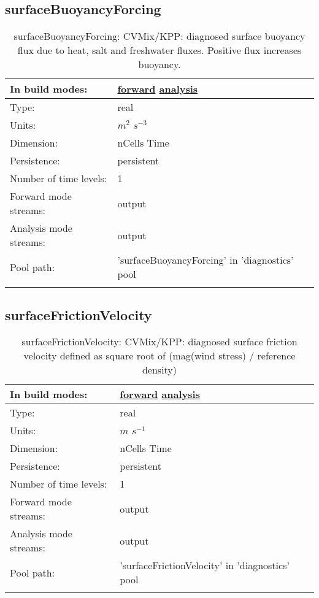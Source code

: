 \subsection[surfaceBuoyancyForcing]{surfaceBuoyancyForcing}
\label{subsec:var_sec_diagnostics_surfaceBuoyancyForcing}
\begin{center}
\begin{longtable}{| p{2.0in} | p{4.0in} |}
        \hline 
        In build modes: & \hyperref[subsec:forward_var_tab_diagnostics]{forward} \hyperref[subsec:analysis_var_tab_diagnostics]{analysis} \\
        \hline 
        Type: & real \\
        \hline 
        Units: & $m^2$ $s^{-3}$ \\
        \hline 
        Dimension: & nCells Time \\
        \hline 
        Persistence: & persistent \\
        \hline 
        Number of time levels: & 1 \\
        \hline 
		 Forward mode streams: &  output \\
        \hline 
		 Analysis mode streams: &  output \\
        \hline 
            Pool path: & 'surfaceBuoyancyForcing' in 'diagnostics' pool
 \\
		 \hline 
    \caption{surfaceBuoyancyForcing: CVMix/KPP: diagnosed surface buoyancy flux due to heat, salt and freshwater fluxes. Positive flux increases buoyancy.}
\end{longtable}
\end{center}
\subsection[surfaceFrictionVelocity]{surfaceFrictionVelocity}
\label{subsec:var_sec_diagnostics_surfaceFrictionVelocity}
\begin{center}
\begin{longtable}{| p{2.0in} | p{4.0in} |}
        \hline 
        In build modes: & \hyperref[subsec:forward_var_tab_diagnostics]{forward} \hyperref[subsec:analysis_var_tab_diagnostics]{analysis} \\
        \hline 
        Type: & real \\
        \hline 
        Units: & $m$ $s^{-1}$ \\
        \hline 
        Dimension: & nCells Time \\
        \hline 
        Persistence: & persistent \\
        \hline 
        Number of time levels: & 1 \\
        \hline 
		 Forward mode streams: &  output \\
        \hline 
		 Analysis mode streams: &  output \\
        \hline 
            Pool path: & 'surfaceFrictionVelocity' in 'diagnostics' pool
 \\
		 \hline 
    \caption{surfaceFrictionVelocity: CVMix/KPP: diagnosed surface friction velocity defined as square root of (mag(wind stress) / reference density)}
\end{longtable}
\end{center}
